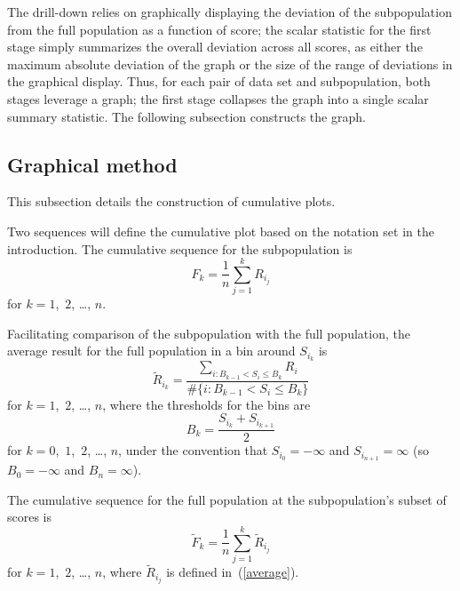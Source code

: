 \documentclass{article}
\begin{document}
The drill-down relies on graphically displaying the deviation
of the subpopulation from the full population as a function of score;
the scalar statistic for the first stage simply summarizes
the overall deviation across all scores,
as either the maximum absolute deviation of the graph
or the size of the range of deviations in the graphical display.
Thus, for each pair of data set and subpopulation,
both stages leverage a graph; the first stage collapses the graph
into a single scalar summary statistic.
The following subsection constructs the graph.


\subsection{Graphical method}
\label{graphical}

This subsection details the construction of cumulative plots.

Two sequences will define the cumulative plot
based on the notation set in the introduction.
The cumulative sequence for the subpopulation is
%
\begin{equation}
\label{empirical}
F_k = \frac{1}{n} \sum_{j=1}^k R_{i_j}
\end{equation}
%
for $k = 1$,~$2$, \dots, $n$.

Facilitating comparison of the subpopulation with the full population,
the average result for the full population in a bin around $S_{i_k}$ is
%
\begin{equation}
\label{average}
\tilde{R}_{i_k} = \frac{\sum_{i : B_{k-1} < S_i \le B_k} R_i}
                       {\#\{i : B_{k-1} < S_i \le B_k\}}
\end{equation}
%
for $k = 1$,~$2$, \dots, $n$, where the thresholds for the bins are
%
\begin{equation}
\label{B}
B_k = \frac{S_{i_k} + S_{i_{k+1}}}{2}
\end{equation}
%
for $k = 0$,~$1$,~$2$, \dots, $n$, under the convention that
$S_{i_0} = -\infty$ and $S_{i_{n+1}} = \infty$
(so $B_0 = -\infty$ and $B_n = \infty$).

The cumulative sequence for the full population at the subpopulation's subset
of scores is
%
\begin{equation}
\label{full}
\tilde{F}_k = \frac{1}{n} \sum_{j=1}^k \tilde{R}_{i_j}
\end{equation}
%
for $k = 1$,~$2$, \dots, $n$,
where $\tilde{R}_{i_j}$ is defined in~(\ref{average}).
\end{document}
